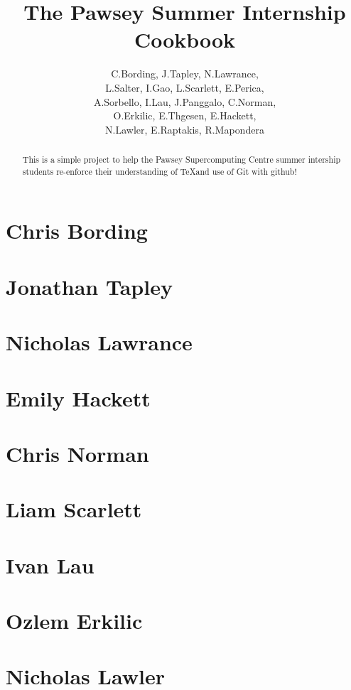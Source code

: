 \documentclass[11pt,a4paper]{report}
\title{The Pawsey Summer Internship Cookbook}
\author{C.Bording, J.Tapley, N.Lawrance,\\
L.Salter, I.Gao, L.Scarlett, E.Perica,\\
A.Sorbello, I.Lau, J.Panggalo, C.Norman,\\
O.Erkilic, E.Thgesen, E.Hackett,\\
N.Lawler, E.Raptakis, R.Mapondera}
\begin{document}
\maketitle
\tableofcontents


\begin{abstract}

This is a simple project to help the Pawsey Supercomputing Centre summer intership students re-enforce their understanding of \TeX and use of Git with github!

\end{abstract}

\chapter{Chris Bording}



\chapter{Jonathan Tapley}


\chapter{Nicholas Lawrance}


\chapter{Emily Hackett}


\chapter{Chris Norman}


\chapter{Liam Scarlett}


\chapter{Ivan Lau}


\chapter{Ozlem Erkilic}


\chapter{Nicholas Lawler}

\end{document}
